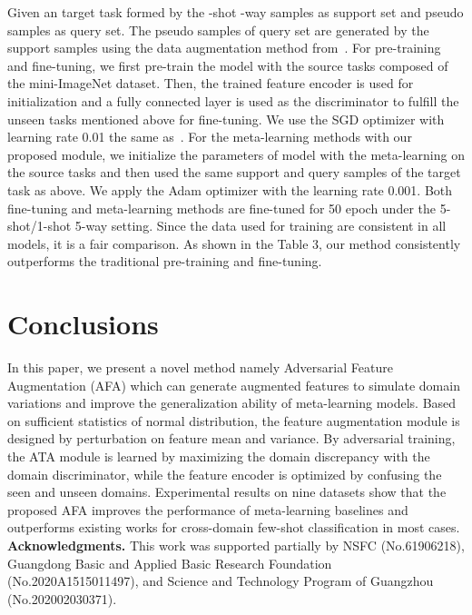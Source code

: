 \documentclass[runningheads]{utils/llncs}
\begin{document}
Given an target task  formed by the -shot -way samples as support set and  pseudo samples as query set. 
The pseudo samples of query set are generated by the support samples using the data augmentation method from~\cite{abs09218}. 
For pre-training and fine-tuning, we first pre-train the model with the source tasks composed of the mini-ImageNet dataset. 
Then, the trained feature encoder is used for initialization and a fully connected layer is used as the discriminator to fulfill the unseen tasks mentioned above for fine-tuning. 
We use the SGD optimizer with learning rate 0.01 the same as~\cite{GuoCKCSSRF20}. 
For the meta-learning methods with our proposed module, we initialize the parameters of model with the meta-learning on the source tasks and then used the same support and query samples of the target task as above. 
We apply the Adam optimizer with the learning rate 0.001. 
Both fine-tuning and meta-learning methods are fine-tuned for 50 epoch under the 5-shot/1-shot 5-way setting. 
Since the data used for training are consistent in all models, it is a fair comparison. 
As shown in the Table 3, our method consistently outperforms the traditional pre-training and fine-tuning. 












 \section{Conclusions}

In this paper, we present a novel method namely Adversarial Feature Augmentation (AFA) which can generate augmented features to simulate domain variations and improve the generalization ability of meta-learning models. 
Based on sufficient statistics of normal distribution, the feature augmentation module is designed by perturbation on feature mean and variance.
By adversarial training, the ATA module is learned by maximizing the domain discrepancy with the domain discriminator, while the feature encoder is optimized by confusing the seen and unseen domains. 
Experimental results on nine datasets show that the proposed AFA improves the performance of meta-learning baselines and outperforms existing works for cross-domain few-shot classification in most cases. \\



\noindent\textbf{Acknowledgments.} This work was supported partially by NSFC (No.61906218), Guangdong Basic and Applied Basic Research Foundation (No.2020A1515011497), and Science and Technology Program of Guangzhou (No.202002030371). 

\clearpage


\end{document}
